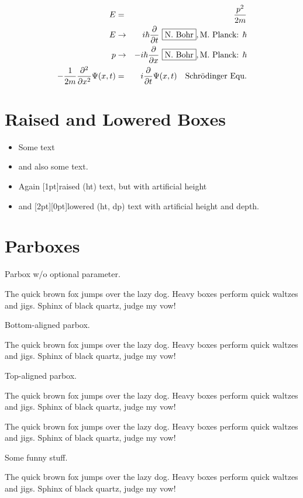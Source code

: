 \documentclass{article}
\begin{document}
\begin{eqnarray}
  E  &  =  &
  \frac{p^2}{2m}  \\
  E  &  \rightarrow  &
  i \hbar \frac{\partial}{\partial{}t}\ \framebox{N.~Bohr}, \makebox{M.~Planck: $\hbar$}  \\
  p  &  \rightarrow  &
  -i \hbar \frac{\partial}{\partial{}x}\ \framebox{N.~Bohr}, \makebox{M.~Planck: $\hbar$}  \\
  -\frac{1}{2m} \frac{\partial^2}{\partial{}x^2} \Psi(x, t)  &  =  &
  i \frac{\partial}{\partial{}t}\Psi(x, t)\quad\makebox{Schr\"odinger Equ.}
\end{eqnarray}

\newcommand*{\samplephrase}{The quick brown fox jumps over the lazy
  dog.  Heavy boxes per\-form quick waltzes and jigs.  Sphinx of black
  quartz, judge my vow!}

\section{Raised and Lowered Boxes}

\begin{itemize}
\item Some \raisebox{0.25em}{raised} text
\item and also some \raisebox{-0.125em}{lowered} text.
\item Again \raisebox{1.5em}[1pt]{raised (ht)} text, but with
  artificial height
\item and \raisebox{-0.25em}[2pt][0pt]{lowered (ht, dp)} text
  with artificial height and depth.
\end{itemize}

\section{Parboxes}

Parbox w/o optional parameter.\quad\parbox{14em}{\samplephrase}

\noindent Bottom-aligned parbox.\quad\parbox[b]{14em}{\samplephrase}

\noindent Top-aligned parbox.\quad\parbox[t]{14em}{\samplephrase}

\noindent \parbox{10em}{\samplephrase}\quad
Some funny stuff.\quad\parbox{10em}{\samplephrase}
\end{document}
